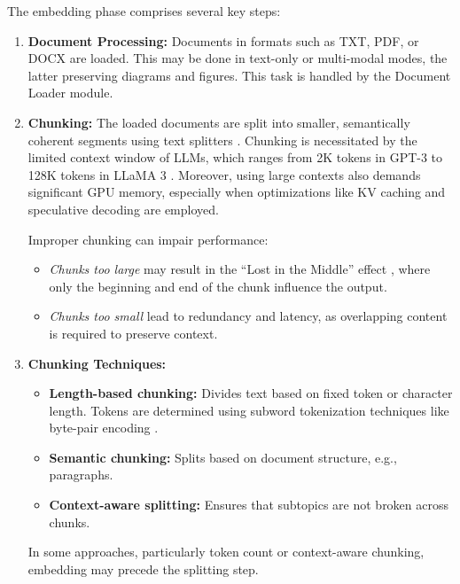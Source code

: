The embedding phase comprises several key steps:

\begin{enumerate}[label=\alph*.]
  \item \textbf{Document Processing:} Documents in formats such as TXT, PDF, or DOCX are loaded. This may be done in text-only or multi-modal modes, the latter preserving diagrams and figures. This task is handled by the Document Loader module.

  \item \textbf{Chunking:} The loaded documents are split into smaller, semantically coherent segments using text splitters \cite{langchain2023textsplitters}. Chunking is necessitated by the limited context window of LLMs, which ranges from 2K tokens in GPT-3 to 128K tokens in LLaMA 3 \cite{touvron2024llama3}. Moreover, using large contexts also demands significant GPU memory, especially when optimizations like KV caching and speculative decoding are employed.

  Improper chunking can impair performance:
  \begin{itemize}
    \item \textit{Chunks too large} may result in the ``Lost in the Middle'' effect \cite{liu2023long}, where only the beginning and end of the chunk influence the output.
    \item \textit{Chunks too small} lead to redundancy and latency, as overlapping content is required to preserve context.
  \end{itemize}

  \item \textbf{Chunking Techniques:}
  \begin{itemize}
    \item \textbf{Length-based chunking:} Divides text based on fixed token or character length. Tokens are determined using subword tokenization techniques like byte-pair encoding \cite{sennrich2015neural}.
    \item \textbf{Semantic chunking:} Splits based on document structure, e.g., paragraphs.
    \item \textbf{Context-aware splitting:} Ensures that subtopics are not broken across chunks.
  \end{itemize}

  In some approaches, particularly token count or context-aware chunking, embedding may precede the splitting step.


\end{enumerate}
